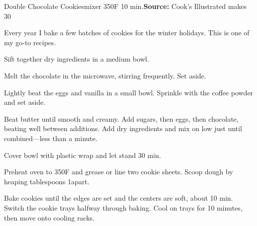 \begin{recipe}{Double Chocolate Cookies}{mixer \hfill 350\0F \hfill 10 min.}{\textbf{Source:} Cook's Illustrated \hfill makes 30}

 \freeform Every year I bake a few batches of cookies for the winter holidays. This is one of my go-to recipes.

 Sift together dry ingredients in a medium bowl.

 Melt the chocolate in the microwave, stirring frequently. Set aside.

 Lightly beat the eggs and vanilla in a small bowl. Sprinkle with the coffee powder and set aside.

 Beat butter until smooth and creamy. Add sugars, then eggs, then chocolate, beating well between additions. Add dry ingredients and mix on low just until combined---less than a minute.

 \newstep Cover bowl with plastic wrap and let stand 30 min.

 \newstep Preheat oven to 350\0F and grease or line two cookie sheets. Scoop dough by heaping tablespoons 1\inch apart.

 \newstep Bake cookies until the edges are set and the centers are soft, about 10 min. Switch the cookie trays halfway through baking. Cool on trays for 10 minutes, then move onto cooling racks.

\end{recipe}


